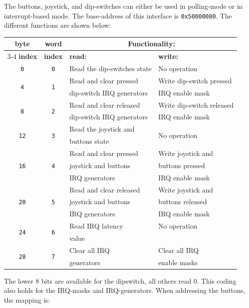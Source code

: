 \documentclass[a4paper,twoside,12pt]{article}
\begin{document}
The buttons, joystick, and dip-switches can either be used in polling-mode or in interrupt-based mode. The base-address of this interface is \texttt{0x50000080}. The different functions are shown below:
\begin{center}
\begin{tabular}{|c|c|l|l|}
\hline
\textbf{byte}&\textbf{word}&\multicolumn{2}{|c|}{\textbf{Functionality:}}\\
\cline{3-4}
\textbf{index}&\textbf{index}&\textbf{read:}&\textbf{write:}\\
\hline
\hline
\texttt{0}&\texttt{0}&Read the dip-switches state&No operation\\
\hline
\multirow{2}{*}{\texttt{4}}&\multirow{2}{*}{\texttt{1}}&Read and clear pressed&Write dip-switch pressed\\
&&dip-switch IRQ generators&IRQ enable mask\\
\hline
\multirow{2}{*}{\texttt{8}}&\multirow{2}{*}{\texttt{2}}&Read and clear released&Write dip-switch released\\
&&dip-switch IRQ generators&IRQ enable mask\\
\hline
\multirow{2}{*}{\texttt{12}}&\multirow{2}{*}{\texttt{3}}&Read the joystick and&\multirow{2}{*}{No operation}\\
&&buttons state&\\
\hline
\multirow{3}{*}{\texttt{16}}&\multirow{3}{*}{\texttt{4}}&Read and clear pressed&Write joystick and\\
&&joystick and buttons&buttons pressed\\
&&IRQ generators&IRQ enable mask\\
\hline
\multirow{3}{*}{\texttt{20}}&\multirow{3}{*}{\texttt{5}}&Read and clear released&Write joystick and\\
&&joystick and buttons&buttons released\\
&&IRQ generators&IRQ enable mask\\
\hline
\multirow{2}{*}{\texttt{24}}&\multirow{2}{*}{\texttt{6}}&Read IRQ latency&No operation\\
&&value&\\
\hline
\multirow{2}{*}{\texttt{28}}&\multirow{2}{*}{\texttt{7}}&Clear all IRQ&Clear all IRQ\\
&&generators&enable masks\\
\hline
\end{tabular}
\end{center}
The lower 8 bits are available for the dipswitch, all others read 0. This coding also holds for the IRQ-masks and IRQ-generators. When addressing the buttons, the mapping is:
\end{document}
